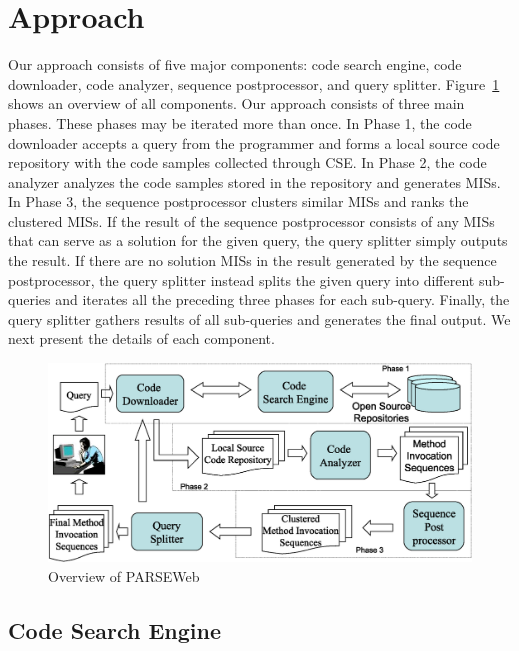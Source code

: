 \section{Approach}
\label{sec:summary}

Our approach consists of five major components: code search engine,
code downloader, code analyzer, sequence postprocessor, and query splitter.
Figure~\ref{fig:architecture} shows an overview of all components.
Our approach consists of three main phases.
These phases may be iterated more than once. In Phase
1, the code downloader accepts a query from the programmer and forms
a local source code repository with the code samples collected
through CSE. In Phase 2, the code analyzer analyzes the code samples
stored in the repository and generates MISs. In Phase 3, the
sequence postprocessor clusters similar MISs and ranks the clustered MISs.
If the result of the sequence postprocessor consists of any MISs that can
serve as a solution for the given query, the query splitter simply
outputs the result. If there are no solution MISs in the result
generated by the sequence postprocessor, the query splitter instead splits
the given query into different sub-queries and iterates all the
preceding three phases for each sub-query. Finally, the query
splitter gathers results of all sub-queries and generates the final
output. We next present the details of each component.
\begin{figure}[t]
\centering
\includegraphics[scale=0.32,clip]{PARSEWeb_overview_new.eps}\vspace*{-1ex}
\caption{Overview of PARSEWeb} \label{fig:architecture}
\vspace*{-2ex}
\end{figure}
\subsection{Code Search Engine}

